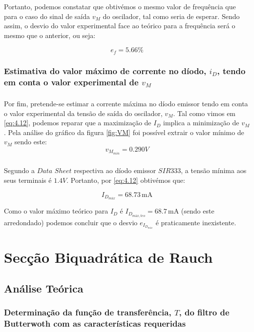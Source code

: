 \documentclass[a4paper,11pt]{report}
\begin{document}
Portanto, podemos constatar que obtivémos o mesmo valor de frequência que para o caso do sinal de saída $v_M$ do oscilador, tal como seria de esperar. Sendo assim, o desvio do valor experimental face ao teórico para a frequência será o mesmo que o anterior, ou seja:

$$e_{f}=5.66\%$$

\subsection{Estimativa do valor máximo de corrente no díodo, $i_D$, tendo em conta o valor experimental de $v_M$}

\paragraph{}Por fim, pretende-se estimar a corrente máxima no díodo emissor tendo em conta o valor experimental da tensão de saída do oscilador, $v_M$. Tal como vimos em \ref{eq:4.12}, podemos reparar que a maximização de $I_D$ implica a minimização de $v_M$. Pela análise do gráfico da figura  \ref{fig:VM} foi possível extrair o valor mínimo de $v_M$ sendo este:
$$v_{M_{min}}=0.290V$$

\paragraph{}Segundo a $Data$ $Sheet$ respectiva ao díodo emissor $SIR333$, a tensão mínima aos seus terminais é $1.4V$. Portanto, por \ref{eq:4.12} obtivémos que:

$$I_{{D}_{máx}}=68.73 \,\textrm{mA}$$

Como o valor máximo teórico para $I_D$ é $I_{{D}_{máx,teo}}=68.7\,\textrm{mA}$ (sendo este arredondado) podemos concluir que o desvio $e_{I_{{D}_{máx}}}$ é praticamente inexistente.




\chapter{Secção Biquadrática de Rauch}

\section{Análise Teórica}

\subsection{Determinação da função de transferência, $T$, do filtro de Butterwoth com as características requeridas}
\end{document}
